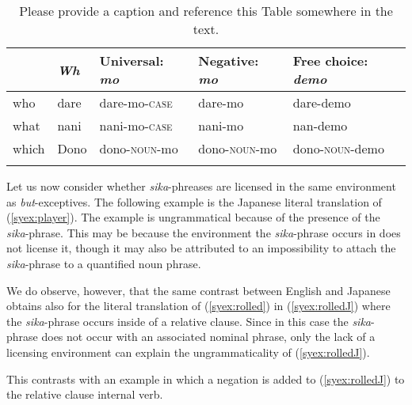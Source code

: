 \documentclass[output=paper]{langscibook}
\begin{document}
\begin{table}
  \caption{\color{red}Please provide a caption and reference this Table somewhere in the text.}
  \begin{tabular}{*5{l}}
  \lsptoprule
  {} & \emph{Wh} & Universal: \textit{mo} & Negative: \textit{mo} & Free choice: \textit{demo}\\\midrule
  who & dare & dare-mo-\textsc{case} & dare-mo & dare-demo\\
  what & nani & nani-mo-\textsc{case} & nani-mo & nan-demo\\
  which & Dono & dono-\textsc{noun}-mo & dono-\textsc{noun}-mo & dono-\textsc{noun}-demo\\
  \lspbottomrule
  \end{tabular}
\end{table}

Let us now consider whether \emph{sika}-phreases are licensed in the same environment as \emph{but}-exceptives.
The following example is the Japanese literal translation of (\ref{syex:player}).  The example is ungrammatical because of the presence of the  \emph{sika}-phrase.  This may be because the environment the \emph{sika}-phrase occurs in does not license it, though it may also be attributed to an impossibility to attach the \emph{sika}-phrase to a quantified noun phrase.

\z

We do observe, however, that the same contrast between English and Japanese obtains also for the literal translation of (\ref{syex:rolled}) in (\ref{syex:rolledJ}) where the \emph{sika}-phrase occurs inside of a relative clause.
Since in this case the \emph{sika}-phrase does not occur with an associated nominal phrase, only the lack of a licensing environment can explain the ungrammaticality of (\ref{syex:rolledJ}).

\z

This contrasts with an example in which a negation is added to (\ref{syex:rolledJ}) to the relative clause internal verb.
\end{document}
